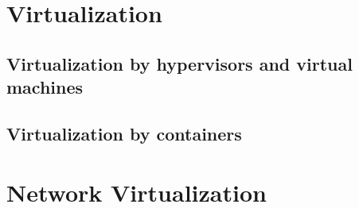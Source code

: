 





% 
%
%
%
\section{Virtualization}





\subsection{Virtualization by hypervisors and virtual machines}


\subsection{Virtualization by containers}



\section{Network Virtualization}
%
%
%
%
%

